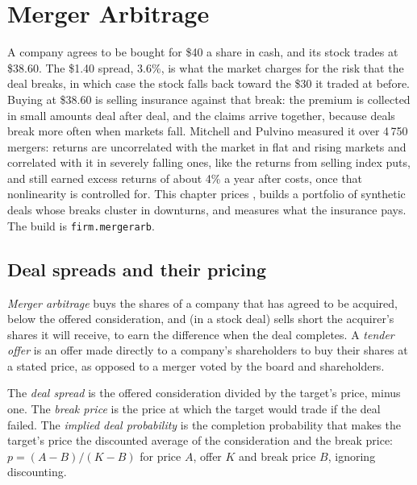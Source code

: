 \chapter{Merger Arbitrage}\label{ch:s1:merger-arbitrage}

A company agrees to be bought for \$40 a share in cash, and its stock trades at \$38.60. The \$1.40 spread, 3.6\%, is what the market charges for the risk
that the deal breaks, in which case the stock falls back toward the \$30 it traded at before. Buying at \$38.60 is selling insurance against that break:
the premium is collected in small amounts deal after deal, and the claims arrive together, because deals break more often when markets fall. Mitchell and
Pulvino measured it over 4\,750 mergers:  returns are uncorrelated with the market in flat and rising markets and correlated with it in
severely falling ones, like the returns from selling index puts, and still earned excess returns of about 4\% a year after costs, once that nonlinearity is controlled for. This chapter prices
, builds a portfolio of synthetic deals whose breaks cluster in downturns, and measures what the insurance pays. The build is
\texttt{firm.mergerarb}.

\section{Deal spreads and their pricing}

\begin{definition}\label{def:s1:merger-arbitrage:arb}
\emph{Merger arbitrage} buys the shares of a company that has agreed to be acquired, below the offered consideration, and (in a
stock deal) sells short the acquirer's shares it will receive, to earn the difference when the deal completes. A \emph{tender offer} is
an offer made directly to a company's shareholders to buy their shares at a stated price, as opposed to a merger voted by the board and shareholders.
\end{definition}

\begin{definition}\label{def:s1:merger-arbitrage:spread}
The \emph{deal spread} is the offered consideration divided by the target's price, minus one. The \emph{break price}
is the price at which the target would trade if the deal failed. The \emph{implied deal probability} is the completion
probability that makes the target's price the discounted average of the consideration and the break price: $p = (A - B)/(K - B)$ for price $A$, offer $K$
and break price $B$, ignoring discounting.
\end{definition}

